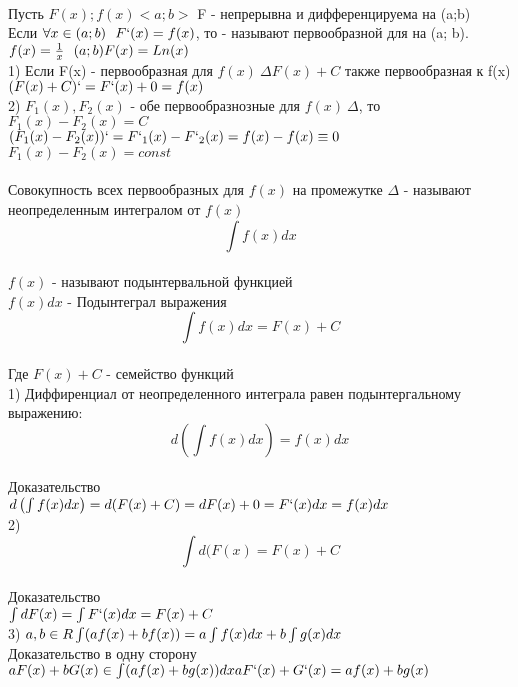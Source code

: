 \begin {center}
\end {center}

 \\
Пусть $F(x); f(x) <a; b>$ F - непрерывна и дифференцируема на (a;b) \\
Если $\forall x \in (a; b) ~~ F`(x) = f(x)$, то  - называют первообразной для  на (a; b). \\
$f(x) = \frac {1}{x} ~~ (a; b) \\
F(x) = Ln(x)$ \\

1) Если F(x) - первообразная для $f(x) ~ \Delta F(x) + C$ также первообразная к f(x) $(F(x) + C)` = F`(x) + 0 = f(x)$ \\
2) $F_{1}(x), F_{2}(x)$ - обе первообразнозные для $f(x) ~ \Delta$, то $F_{1}(x) - F_{2}(x) = C$ \\

$(F_{1}(x) - F_{2}(x))` = F`_{1}(x) - F`_{2}(x) = f(x) - f(x) \equiv 0$ \\
$F_{1}(x) - F_{2}(x) = const$ \\

 \\
Совокупность всех первообразных для $f(x)$ на промежутке $\Delta$ - называют неопределенным интегралом от $f(x)$ \\
\[\int f(x)dx\] \\
$f(x)$ - называют подынтервальной функцией \\
$f(x)dx$ - Подынтеграл выражения \\
\[\int f(x)dx = F(x) + C\] \\
Где $F(x) + C$ - семейство функций \\

1) Диффиренциал от неопределенного интеграла равен подынтергальному выражению:
\[d \left ( \int f(x)dx \right ) = f(x)dx \] \\
 Доказательство \\
$d \left ( \int f(x)dx \right ) = d(F(x) + C) = dF(x) + 0 = F`(x)dx = f(x)dx$ \\

2)\[\int d(F(x) = F(x) + C\] \\
 Доказательство \\
$\int dF(x) = \int F`(x)dx = F(x) + C$ \\

3) $a, b \in R \\
\int (af(x) + bf(x)) = a \int f(x)dx + b \int g(x)dx$ \\
Доказательство в одну сторону \\
$aF(x) + bG(x) \in \int (af(x) + bg(x))dx \\
aF`(x) + G`(x) = af(x) + bg(x)$ \\

